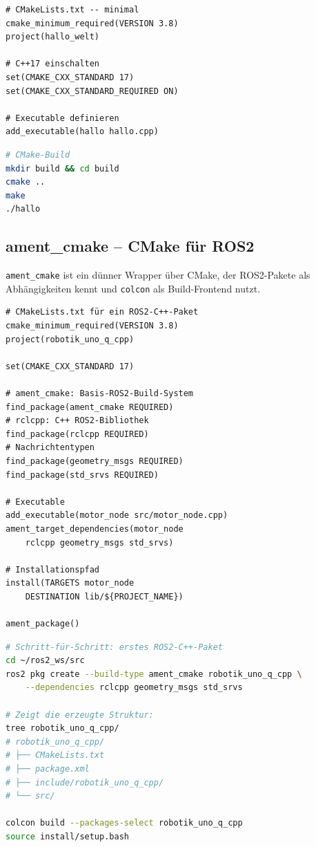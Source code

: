 \begin{lstlisting}[style=cmake]
# CMakeLists.txt -- minimal
cmake_minimum_required(VERSION 3.8)
project(hallo_welt)

# C++17 einschalten
set(CMAKE_CXX_STANDARD 17)
set(CMAKE_CXX_STANDARD_REQUIRED ON)

# Executable definieren
add_executable(hallo hallo.cpp)
\end{lstlisting}

\begin{lstlisting}[language=bash]
# CMake-Build
mkdir build && cd build
cmake ..
make
./hallo
\end{lstlisting}

\subsection{ament\_cmake -- CMake für ROS2}

\texttt{ament\_cmake} ist ein dünner Wrapper über CMake,
der ROS2-Pakete als Abhängigkeiten kennt
und \texttt{colcon} als Build-Frontend nutzt.

\begin{lstlisting}[style=cmake]
# CMakeLists.txt für ein ROS2-C++-Paket
cmake_minimum_required(VERSION 3.8)
project(robotik_uno_q_cpp)

set(CMAKE_CXX_STANDARD 17)

# ament_cmake: Basis-ROS2-Build-System
find_package(ament_cmake REQUIRED)
# rclcpp: C++ ROS2-Bibliothek
find_package(rclcpp REQUIRED)
# Nachrichtentypen
find_package(geometry_msgs REQUIRED)
find_package(std_srvs REQUIRED)

# Executable
add_executable(motor_node src/motor_node.cpp)
ament_target_dependencies(motor_node
    rclcpp geometry_msgs std_srvs)

# Installationspfad
install(TARGETS motor_node
    DESTINATION lib/${PROJECT_NAME})

ament_package()
\end{lstlisting}

\begin{loesungBox}
\begin{lstlisting}[language=bash]
# Schritt-für-Schritt: erstes ROS2-C++-Paket
cd ~/ros2_ws/src
ros2 pkg create --build-type ament_cmake robotik_uno_q_cpp \
    --dependencies rclcpp geometry_msgs std_srvs

# Zeigt die erzeugte Struktur:
tree robotik_uno_q_cpp/
# robotik_uno_q_cpp/
# ├── CMakeLists.txt
# ├── package.xml
# ├── include/robotik_uno_q_cpp/
# └── src/

colcon build --packages-select robotik_uno_q_cpp
source install/setup.bash
\end{lstlisting}
\end{loesungBox}

